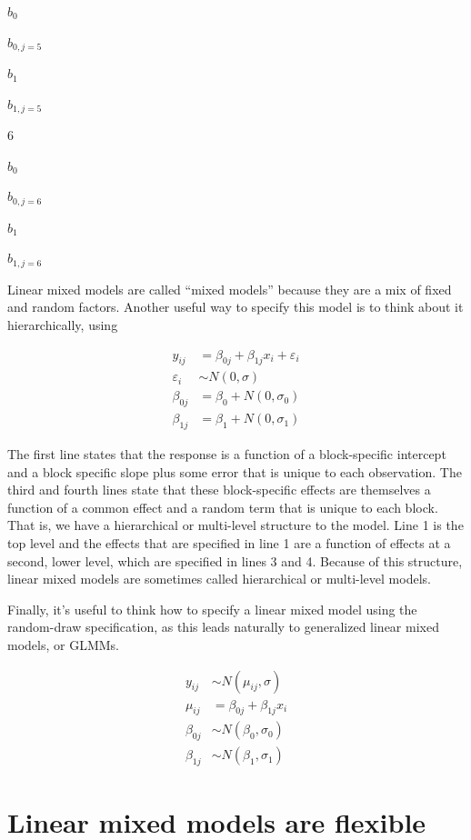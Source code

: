 \documentclass[]{book}
\begin{document}
\(b_0\)

\(b_{0,j=5}\)

\(b_1\)

\(b_{1,j=5}\)

6

\(b_0\)

\(b_{0,j=6}\)

\(b_1\)

\(b_{1,j=6}\)

Linear mixed models are called ``mixed models'' because they are a mix of fixed and random factors. Another useful way to specify this model is to think about it hierarchically, using

\begin{align}
y_{ij} &= \beta_{0j} + \beta_{1j}x_i + \varepsilon_i \\
\varepsilon_i &\sim N(0, \sigma) \\
\beta_{0j} &= \beta_{0} + N(0, \sigma_{0}) \\
\beta_{1j} &= \beta_{1} + N(0, \sigma_{1})
\label{eq:lmm-spec2}
\end{align}

The first line states that the response is a function of a block-specific intercept and a block specific slope plus some error that is unique to each observation. The third and fourth lines state that these block-specific effects are themselves a function of a common effect and a random term that is unique to each block. That is, we have a hierarchical or multi-level structure to the model. Line 1 is the top level and the effects that are specified in line 1 are a function of effects at a second, lower level, which are specified in lines 3 and 4. Because of this structure, linear mixed models are sometimes called hierarchical or multi-level models.

Finally, it's useful to think how to specify a linear mixed model using the random-draw specification, as this leads naturally to generalized linear mixed models, or GLMMs.

\begin{align}
y_{ij} &\sim N(\mu_{ij}, \sigma) \\
\mu_{ij} &=\beta_{0j} + \beta_{1j}x_i \\
\beta_{0j} &\sim N(\beta_0, \sigma_0) \\
\beta_{1j} &\sim N(\beta_1, \sigma_1)
\label{eq:lmm-spec3}
\end{align}

\hypertarget{linear-mixed-models-are-flexible}{%
\section{Linear mixed models are flexible}\label{linear-mixed-models-are-flexible}}
\end{document}
